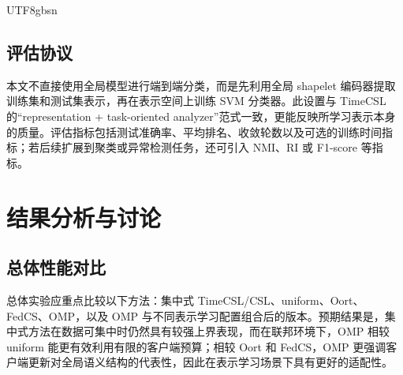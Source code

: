 \documentclass{article}
\begin{document}
\begin{CJK*}{UTF8}{gbsn}
\subsection{评估协议}

本文不直接使用全局模型进行端到端分类，而是先利用全局 shapelet 编码器提取训练集和测试集表示，再在表示空间上训练 SVM 分类器。此设置与 TimeCSL 的“representation + task-oriented analyzer”范式一致，更能反映所学习表示本身的质量。评估指标包括测试准确率、平均排名、收敛轮数以及可选的训练时间指标；若后续扩展到聚类或异常检测任务，还可引入 NMI、RI 或 F1-score 等指标。

\section{结果分析与讨论}

\subsection{总体性能对比}

总体实验应重点比较以下方法：集中式 TimeCSL/CSL、uniform、Oort、FedCS、OMP，以及 OMP 与不同表示学习配置组合后的版本。预期结果是，集中式方法在数据可集中时仍然具有较强上界表现，而在联邦环境下，OMP 相较 uniform 能更有效利用有限的客户端预算；相较 Oort 和 FedCS，OMP 更强调客户端更新对全局语义结构的代表性，因此在表示学习场景下具有更好的适配性。


\end{CJK*}
\end{document}
